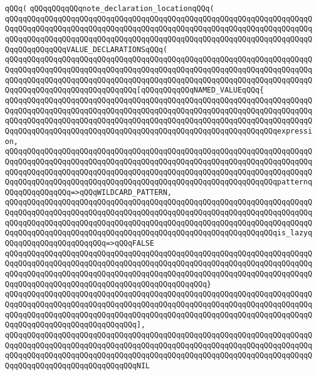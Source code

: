 \verb|qQQq(|\newline
\verb|qQQqqQQqqQQqnote_declaration_locationqQQq(|\newline
\verb|qQQqqQQqqQQqqQQqqQQqqQQqqQQqqQQqqQQqqQQqqQQqqQQqqQQqqQQqqQQqqQQqqQQqqQQqqQQqqQQqqQQqqQQqqQQqqQQqqQQqqQQqqQQqqQQqqQQqqQQqqQQqqQQqqQQqqQQqqQQqqQQqqQQqqQQqqQQqqQQqqQQqqQQqqQQqqQQqqQQqqQQqqQQqqQQqqQQqqQQqqQQqqQQqqQQqqQQqqQQqqQQqVALUE_DECLARATIONSqQQq(|\newline
\verb|qQQqqQQqqQQqqQQqqQQqqQQqqQQqqQQqqQQqqQQqqQQqqQQqqQQqqQQqqQQqqQQqqQQqqQQqqQQqqQQqqQQqqQQqqQQqqQQqqQQqqQQqqQQqqQQqqQQqqQQqqQQqqQQqqQQqqQQqqQQqqQQqqQQqqQQqqQQqqQQqqQQqqQQqqQQqqQQqqQQqqQQqqQQqqQQqqQQqqQQqqQQqqQQqqQQqqQQqqQQqqQQqqQQqqQQqqQQqqQQq[qQQqqQQqqQQqNAMED_VALUEqQQq{|\newline
\verb|qQQqqQQqqQQqqQQqqQQqqQQqqQQqqQQqqQQqqQQqqQQqqQQqqQQqqQQqqQQqqQQqqQQqqQQqqQQqqQQqqQQqqQQqqQQqqQQqqQQqqQQqqQQqqQQqqQQqqQQqqQQqqQQqqQQqqQQqqQQqqQQqqQQqqQQqqQQqqQQqqQQqqQQqqQQqqQQqqQQqqQQqqQQqqQQqqQQqqQQqqQQqqQQqqQQqqQQqqQQqqQQqqQQqqQQqqQQqqQQqqQQqqQQqqQQqqQQqqQQqqQQqqQQqqQQqexpression,|\newline
\verb|qQQqqQQqqQQqqQQqqQQqqQQqqQQqqQQqqQQqqQQqqQQqqQQqqQQqqQQqqQQqqQQqqQQqqQQqqQQqqQQqqQQqqQQqqQQqqQQqqQQqqQQqqQQqqQQqqQQqqQQqqQQqqQQqqQQqqQQqqQQqqQQqqQQqqQQqqQQqqQQqqQQqqQQqqQQqqQQqqQQqqQQqqQQqqQQqqQQqqQQqqQQqqQQqqQQqqQQqqQQqqQQqqQQqqQQqqQQqqQQqqQQqqQQqqQQqqQQqqQQqqQQqqQQqqQQqpatternqQQqqQQqqQQqqQQq=>qQQqWILDCARD_PATTERN,|\newline
\verb|qQQqqQQqqQQqqQQqqQQqqQQqqQQqqQQqqQQqqQQqqQQqqQQqqQQqqQQqqQQqqQQqqQQqqQQqqQQqqQQqqQQqqQQqqQQqqQQqqQQqqQQqqQQqqQQqqQQqqQQqqQQqqQQqqQQqqQQqqQQqqQQqqQQqqQQqqQQqqQQqqQQqqQQqqQQqqQQqqQQqqQQqqQQqqQQqqQQqqQQqqQQqqQQqqQQqqQQqqQQqqQQqqQQqqQQqqQQqqQQqqQQqqQQqqQQqqQQqqQQqqQQqqQQqqQQqis_lazyqQQqqQQqqQQqqQQqqQQqqQQq=>qQQqFALSE|\newline
\verb|qQQqqQQqqQQqqQQqqQQqqQQqqQQqqQQqqQQqqQQqqQQqqQQqqQQqqQQqqQQqqQQqqQQqqQQqqQQqqQQqqQQqqQQqqQQqqQQqqQQqqQQqqQQqqQQqqQQqqQQqqQQqqQQqqQQqqQQqqQQqqQQqqQQqqQQqqQQqqQQqqQQqqQQqqQQqqQQqqQQqqQQqqQQqqQQqqQQqqQQqqQQqqQQqqQQqqQQqqQQqqQQqqQQqqQQqqQQqqQQqqQQqqQQqqQQqqQQq}|\newline
\verb|qQQqqQQqqQQqqQQqqQQqqQQqqQQqqQQqqQQqqQQqqQQqqQQqqQQqqQQqqQQqqQQqqQQqqQQqqQQqqQQqqQQqqQQqqQQqqQQqqQQqqQQqqQQqqQQqqQQqqQQqqQQqqQQqqQQqqQQqqQQqqQQqqQQqqQQqqQQqqQQqqQQqqQQqqQQqqQQqqQQqqQQqqQQqqQQqqQQqqQQqqQQqqQQqqQQqqQQqqQQqqQQqqQQqqQQqqQQqqQQq],|\newline
\verb|qQQqqQQqqQQqqQQqqQQqqQQqqQQqqQQqqQQqqQQqqQQqqQQqqQQqqQQqqQQqqQQqqQQqqQQqqQQqqQQqqQQqqQQqqQQqqQQqqQQqqQQqqQQqqQQqqQQqqQQqqQQqqQQqqQQqqQQqqQQqqQQqqQQqqQQqqQQqqQQqqQQqqQQqqQQqqQQqqQQqqQQqqQQqqQQqqQQqqQQqqQQqqQQqqQQqqQQqqQQqqQQqqQQqqQQqqQQqqQQqNIL|\newline
